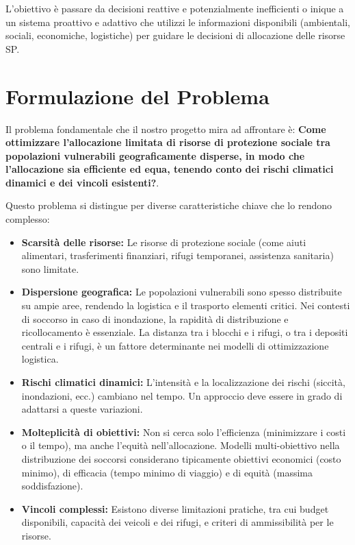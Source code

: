 \documentclass[letterpaper]{article}
\begin{document}
L'obiettivo è passare da decisioni reattive e potenzialmente inefficienti o inique a un sistema proattivo e adattivo che utilizzi le informazioni disponibili (ambientali, sociali, economiche, logistiche) per guidare le decisioni di allocazione delle risorse SP.

\section{Formulazione del Problema}
Il problema fondamentale che il nostro progetto mira ad affrontare è: \textbf{Come ottimizzare l'allocazione limitata di risorse di protezione sociale tra popolazioni vulnerabili geograficamente disperse, in modo che l'allocazione sia efficiente ed equa, tenendo conto dei rischi climatici dinamici e dei vincoli esistenti?}.

Questo problema si distingue per diverse caratteristiche chiave che lo rendono complesso:
\begin{itemize}
    \item \textbf{Scarsità delle risorse:} Le risorse di protezione sociale (come aiuti alimentari, trasferimenti finanziari, rifugi temporanei, assistenza sanitaria) sono limitate.
    \item \textbf{Dispersione geografica:} Le popolazioni vulnerabili sono spesso distribuite su ampie aree, rendendo la logistica e il trasporto elementi critici. Nei contesti di soccorso in caso di inondazione, la rapidità di distribuzione e ricollocamento è essenziale. La distanza tra i blocchi e i rifugi, o tra i depositi centrali e i rifugi, è un fattore determinante nei modelli di ottimizzazione logistica.
    \item \textbf{Rischi climatici dinamici:} L'intensità e la localizzazione dei rischi (siccità, inondazioni, ecc.) cambiano nel tempo. Un approccio deve essere in grado di adattarsi a queste variazioni.
    \item \textbf{Molteplicità di obiettivi:} Non si cerca solo l'efficienza (minimizzare i costi o il tempo), ma anche l'equità nell'allocazione. Modelli multi-obiettivo nella distribuzione dei soccorsi considerano tipicamente obiettivi economici (costo minimo), di efficacia (tempo minimo di viaggio) e di equità (massima soddisfazione).
    \item \textbf{Vincoli complessi:} Esistono diverse limitazioni pratiche, tra cui budget disponibili, capacità dei veicoli e dei rifugi, e criteri di ammissibilità per le risorse.
\end{itemize}
\end{document}
